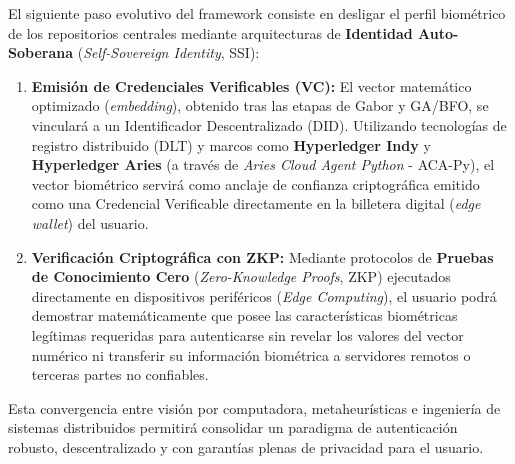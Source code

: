 El siguiente paso evolutivo del framework consiste en desligar el perfil biométrico de los repositorios centrales mediante arquitecturas de \textbf{Identidad Auto-Soberana} (\textit{Self-Sovereign Identity}, SSI):
\begin{enumerate}
    \item \textbf{Emisión de Credenciales Verificables (VC):} El vector matemático optimizado (\textit{embedding}), obtenido tras las etapas de Gabor y GA/BFO, se vinculará a un Identificador Descentralizado (DID). Utilizando tecnologías de registro distribuido (DLT) y marcos como \textbf{Hyperledger Indy} y \textbf{Hyperledger Aries} (a través de \textit{Aries Cloud Agent Python} - ACA-Py), el vector biométrico servirá como anclaje de confianza criptográfica emitido como una Credencial Verificable directamente en la billetera digital (\textit{edge wallet}) del usuario.
    \item \textbf{Verificación Criptográfica con ZKP:} Mediante protocolos de \textbf{Pruebas de Conocimiento Cero} (\textit{Zero-Knowledge Proofs}, ZKP) ejecutados directamente en dispositivos periféricos (\textit{Edge Computing}), el usuario podrá demostrar matemáticamente que posee las características biométricas legítimas requeridas para autenticarse sin revelar los valores del vector numérico ni transferir su información biométrica a servidores remotos o terceras partes no confiables.
\end{enumerate}
Esta convergencia entre visión por computadora, metaheurísticas e ingeniería de sistemas distribuidos permitirá consolidar un paradigma de autenticación robusto, descentralizado y con garantías plenas de privacidad para el usuario.